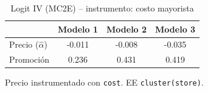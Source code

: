 \begin{table}[H]
\centering
\caption{Logit IV (MC2E) -- instrumento: costo mayorista}
\begin{tabular}{lccc}
\toprule
 & Modelo 1 & Modelo 2 & Modelo 3 \\
\midrule
Precio ($\hat{\alpha}$) & -0.011 & -0.008 & -0.035 \\
Promoci\'on & 0.236 & 0.431 & 0.419 \\
\bottomrule
\end{tabular}

\smallskip
{\footnotesize\begin{minipage}{0.92\linewidth}Precio instrumentado con \texttt{cost}. EE \texttt{cluster(store)}.\end{minipage}}
\end{table}
